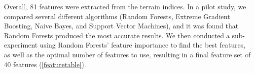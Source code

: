 \documentclass[11pt, review]{elsarticle} %
\begin{document}
Overall, 81 features were extracted from the terrain indices. In a pilot study, we compared several different algorithms (Random Forests, Extreme Gradient Boosting, Naive Bayes, and Support Vector Machines), and it was found that Random Forests produced the most accurate results. We then conducted a sub-experiment using Random Forests' feature importance to find the best features, as well as the optimal number of features to use, resulting in a final feature set of 40 features (\autoref{featuretable}).

\begin{figure} [!htb]
    \centering

\end{figure}
\end{document}
